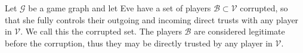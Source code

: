 {}
\begin{definition}
  Let $\mathcal{G}$ be a game graph and let Eve have a set of players $\mathcal{B} \subset \mathcal{V}$ corrupted, so
  that she fully controls their outgoing and incoming direct trusts with any player in $\mathcal{V}$. We call this the
  corrupted set. The players $\mathcal{B}$ are considered legitimate before the corruption, thus they may be directly trusted
  by any player in $\mathcal{V}$.
\end{definition}
